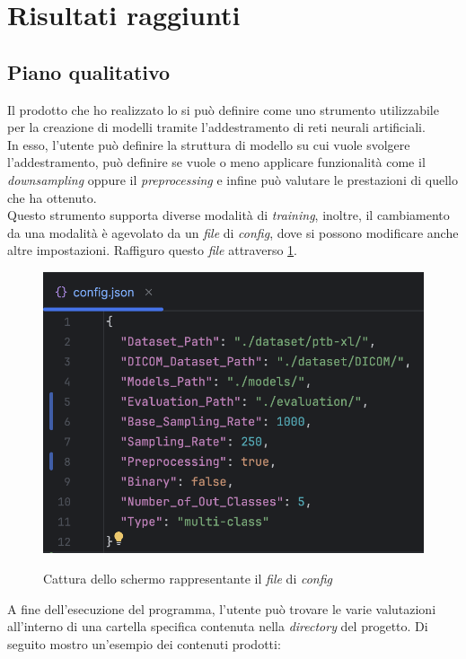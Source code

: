 \section{Risultati raggiunti}\label{sec:results}

\subsection{Piano qualitativo}\noindent
Il prodotto che ho realizzato lo si può definire come uno strumento utilizzabile per la creazione di modelli tramite l'addestramento di reti neurali artificiali.\\
In esso, l'utente può definire la struttura di modello su cui vuole svolgere l'addestramento, può definire se vuole o meno applicare funzionalità come il \textit{downsampling} oppure il \textit{preprocessing} e infine può valutare le prestazioni di quello che ha ottenuto.\\
Questo strumento supporta diverse modalità di \textit{training}, inoltre, il cambiamento da una modalità è agevolato da un \textit{file} di \textit{config}, dove si possono modificare anche altre impostazioni. Raffiguro questo \textit{file} attraverso \ref{fig:config}.
\begin{figure}[H]
    \centering
    \includegraphics[alt={Cattura dello schermo rappresentante il \textit{file} di \textit{config}}, width=0.8\columnwidth]{img/config.png}
    \caption{\centering Cattura dello schermo rappresentante il \textit{file} di \textit{config}}
    \label{fig:config}
\end{figure}\noindent
A fine dell'esecuzione del programma, l'utente può trovare le varie valutazioni all'interno di una cartella specifica contenuta nella \textit{directory} del progetto. Di seguito mostro un'esempio dei contenuti prodotti:
